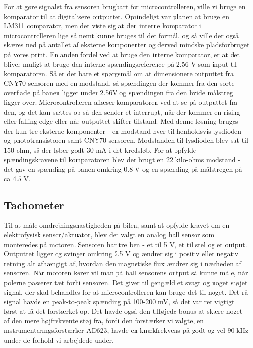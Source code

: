 For at gøre signalet fra sensoren brugbart for microcontrolleren, ville vi bruge en komparator til at digitalisere outputtet. Oprindeligt var planen at bruge en LM311 comparator, men det viste sig at den interne komparator i microcontrolleren lige så nemt kunne bruges til det formål, og så ville der også skæres ned på antallet af eksterne komponenter og derved mindske pladsforbruget på vores print. En anden fordel ved at bruge den interne komparator, er at det bliver muligt at bruge den interne spændingsreference på 2.56 V som input til komparatoren. Så er det bare et spørgsmål om at dimensionere outputtet fra CNY70 sensoren med en modstand, så spændingen der kommer fra den sorte overflade på banen ligger under 2.56V og spændingen fra den hvide målstreg ligger over. Microcontrolleren aflæser komparatoren ved at se på outputtet fra den, og det kan sættes op så den sender et interrupt, når der kommer en rising eller falling edge eller når outputtet skifter tilstand. Med denne løsning bruges der kun tre eksterne komponenter - en modstand hver til henholdsvis lysdioden og phototransistoren samt CNY70 sensoren. Modstanden til lysdioden blev sat til 150 ohm, så der løber godt 30 mA i det kredsløb. For at opfylde spændingskravene til komparatoren blev der brugt en 22 kilo-ohms modstand - det gav en spænding på banen omkring 0.8 V og en spænding på målstregen på ca 4.5 V.

\subsection{Tachometer}

Til at måle omdrejningshastigheden på bilen, samt at opfylde kravet om en elektrofysisk sensor/aktuator, blev der valgt en analog hall sensor som monteredes på motoren. Sensoren har tre ben - et til 5 V, et til stel og et output. Outputtet ligger og svinger omkring 2.5 V og ændrer sig i positiv eller negativ retning alt afhængigt af, hvordan den magnetiske flux ændrer sig i nærheden af sensoren. Når motoren kører vil man på hall sensorens output så kunne måle, når polerne passerer tæt forbi sensoren. Det giver til gengæld et svagt og noget støjet signal, der skal behandles for at microcontrolleren kan bruge det til noget. Det rå signal havde en peak-to-peak spænding på 100-200 mV, så det var ret vigtigt først at få det forstærket op. Det havde også den tilføjede bonus at skære noget af den mere højfrekvente støj fra, fordi den forstærker vi valgte, en instrumenteringsforstærker AD623, havde en knækfrekvens på godt og vel 90 kHz under de forhold vi arbejdede under. 

